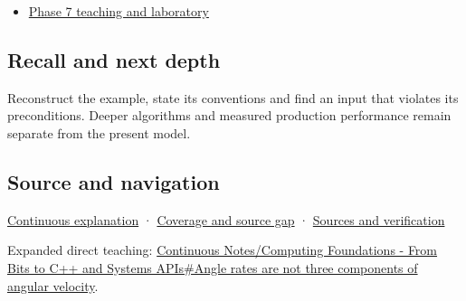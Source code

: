\begin{itemize}
\tightlist
\item
  \hyperref[01-foundations-i-ch018-keep-the-promises-visible-while-moving-between-representations]{Phase 7 teaching and laboratory}
\end{itemize}

\subsection{Recall and next depth}\label{appendix-5f723fbd0593-recall-and-next-depth}

Reconstruct the example, state its conventions and find an input that violates its preconditions. Deeper algorithms and measured production performance remain separate from the present model.

\subsection{Source and navigation}\label{appendix-5f723fbd0593-source-and-navigation}

\hyperref[01-foundations-i-ch018-keep-the-promises-visible-while-moving-between-representations]{Continuous explanation} · \hyperref[appendix-fd090d982a15-phase-7---parts-601-700]{Coverage and source gap} · \hyperref[appendix-a103e7846d21-phase-7---source-analysis-and-verification]{Sources and verification}

Expanded direct teaching: \hyperref[01-foundations-i-ch019-angle-rates-are-not-three-components-of-angular-velocity]{Continuous Notes/Computing Foundations - From Bits to C++ and Systems APIs\#Angle rates are not three components of angular velocity}.
